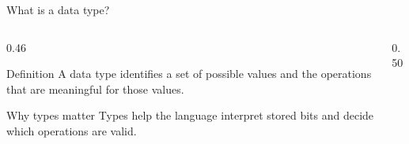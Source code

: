 \documentclass[aspectratio=169]{beamer}
\begin{document}
\begin{frame}{What is a data type?}
  \begin{columns}[T]
    \begin{column}{0.46\textwidth}
      \begin{block}{Definition}
        A data type identifies a set of possible values and the operations that
        are meaningful for those values.
      \end{block}

      \begin{exampleblock}{Why types matter}
        Types help the language interpret stored bits and decide which
        operations are valid.
      \end{exampleblock}
    \end{column}
    \begin{column}{0.50\textwidth}
      \begin{center}
      \end{center}
    \end{column}
  \end{columns}
\end{frame}
\end{document}
